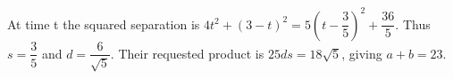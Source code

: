 At time t the squared separation is $4t^2+(3-t)^2=5(t-\dfrac{3}{5})^2+\dfrac{36}{5}$. Thus $s=\dfrac{3}{5}$ and $d=\dfrac{6}{\sqrt5}$. Their requested product is $25ds=18\sqrt5$, giving $a+b=\boxed{23}$.
